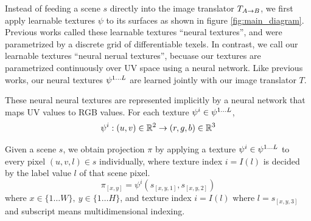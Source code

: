 \documentclass{article}
\begin{document}

		Instead of feeding a scene $s$ directly into the image translator $T_{A\rightarrow B}$, we first apply learnable textures $\psi$ to its surfaces as shown in figure \ref{fig:main_diagram}.
		Previous works called these learnable textures ``neural textures'', and were parametrized by a discrete grid of differentiable texels. 
		In contrast, we call our learnable textures ``neural nerual textures'', becuase our textures are parametrized continuously over UV space using a neural network.
		Like previous works, our neural textures $\psi^{1\dots L}$ are learned jointly with our image translator $T$.
		
		These neural neural textures are represented implicitly by a neural network that maps UV values to RGB values. %
		For each texture $\psi^i \in \psi^{1\dots L}$, 
		\begin{equation}
			\psi^i: (u,v) \in\real^2 \rightarrow (r,g,b) \in\real^3 %
		\end{equation}
		
		Given a scene $s$, we obtain projection $\pi$ by applying a texture $\psi^i \in \psi^{1\dots L}$ to every pixel $(u,v,l) \in s$ individually, where texture index $i=I(l)$ is decided by the label value $l$ of that scene pixel.
		\begin{equation}
			\pi_{[x,y]}=\psi^i(s_{[x,y,1]},s_{[x,y,2]})
		\end{equation}
		where $ x\in \{1\dots W\},\ y\in \{1\dots H\}$, and texture index $i=I(l)$ where $l=s_{[x,y,3]}$ and subscript means multidimensional indexing.
\end{document}
